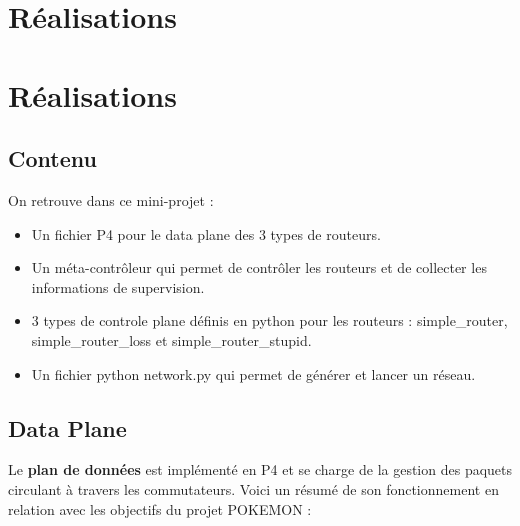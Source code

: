 \documentclass[12pt,a4paper]{report}
\newcommand*\sectiontitle{}
\let\origsection\section
\renewcommand*{\section}[2][]{%
\ifx\setminus#1\setminus%
  \origsection{#2}%
  \renewcommand*\sectiontitle{#2}%
\else
  \origsection[#1]{#2}%
  \renewcommand*\sectiontitle{#1}%
\fi
}
\begin{document}
\section{Réalisations}

    \subsection{Contenu}

    \begin{card}
        On retrouve dans ce mini-projet : 
        \begin{itemize}
            \item Un fichier P4 pour le data plane des 3 types de routeurs.
            \item Un méta-contrôleur qui permet de contrôler les routeurs et de collecter les informations de supervision.
            \item 3 types de controle plane définis en python pour les routeurs : simple_router, simple_router_loss et simple_router_stupid.
            \item Un fichier python network.py qui permet de générer et lancer un réseau.
        \end{itemize}
    \end{card}

    \subsection{Data Plane}

        Le \textbf{plan de données} est implémenté en P4 et se charge de la gestion des paquets circulant à travers les commutateurs. 
        Voici un résumé de son fonctionnement en relation avec les objectifs du projet POKEMON :
\end{document}
